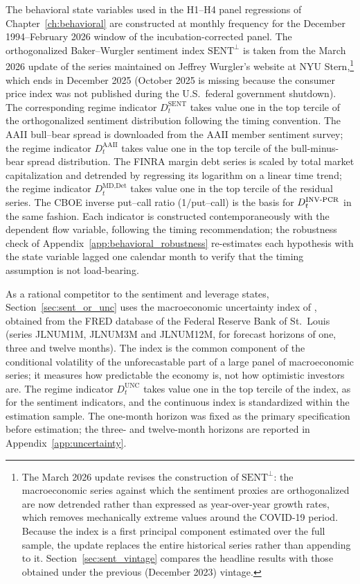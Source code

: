 \documentclass[12pt, oneside]{report}
\renewcommand{\mathrm}[1]{\text{#1}}%
\begin{document}
\noindent The behavioral state variables used in the H1--H4 panel
regressions of Chapter~\ref{ch:behavioral} are constructed at monthly
frequency for the December 1994--February 2026 window of the
incubation-corrected panel. The orthogonalized Baker--Wurgler sentiment
index $\mathrm{SENT}^{\perp}$ is taken from the March 2026 update of the
series maintained on Jeffrey Wurgler's website at NYU
Stern,\footnote{The March 2026 update revises the construction of
$\mathrm{SENT}^{\perp}$: the macroeconomic series against which the
sentiment proxies are orthogonalized are now detrended rather than
expressed as year-over-year growth rates, which removes mechanically
extreme values around the COVID-19 period. Because the index is a first
principal component estimated over the full sample, the update replaces
the entire historical series rather than appending to it.
Section~\ref{sec:sent_vintage} compares the headline results with those
obtained under the previous (December 2023) vintage.} which ends in
December 2025 (October 2025 is missing because the consumer price index
was not published during the U.S.\ federal government shutdown). The
corresponding regime indicator
$D^{\mathrm{SENT}}_t$ takes value one in the top tercile of the
orthogonalized sentiment distribution following the
\textcite{BakerWurgler2007} timing convention. The AAII bull--bear
spread is downloaded from the AAII member sentiment survey; the
regime indicator $D^{\mathrm{AAII}}_t$ takes value one in the top
tercile of the bull-minus-bear spread distribution. The FINRA margin
debt series is scaled by total market capitalization and detrended by
regressing its logarithm on a linear time trend; the regime indicator
$D^{\mathrm{MD,Det}}_t$ takes value one in the top tercile of the
residual series. The CBOE
inverse put--call ratio (1$/$put--call) is the basis for
$D^{\mathrm{INV\text{-}PCR}}_t$ in the same fashion. Each indicator
is constructed contemporaneously with the dependent flow variable,
following the \textcite{BakerWurgler2007} timing recommendation; the
robustness check of Appendix~\ref{app:behavioral_robustness} re-estimates
each hypothesis with the state variable lagged one calendar month to verify that
the timing assumption is not load-bearing.

\noindent As a rational competitor to the sentiment and leverage states,
Section~\ref{sec:sent_or_unc} uses the macroeconomic uncertainty index of
\textcite{JuradoLudvigsonNg2015}, obtained from the FRED database of the
Federal Reserve Bank of St.\ Louis (series JLNUM1M, JLNUM3M and JLNUM12M,
for forecast horizons of one, three and twelve months). The index is the
common component of the conditional volatility of the unforecastable part
of a large panel of macroeconomic series; it measures how predictable the
economy is, not how optimistic investors are. The regime indicator
$D^{\mathrm{UNC}}_t$ takes value one in the top tercile of the index, as
for the sentiment indicators, and the continuous index is standardized
within the estimation sample. The one-month horizon was fixed as the
primary specification before estimation; the three- and twelve-month
horizons are reported in Appendix~\ref{app:uncertainty}.
\end{document}
